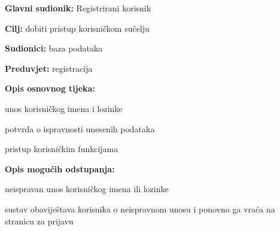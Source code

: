 \noindent {}
\begin{packed_item}
	\item \textbf{Glavni sudionik: }Registrirani korisnik
	\item  \textbf{Cilj:} dobiti pristup korisničkom sučelju
	\item  \textbf{Sudionici:} baza podataka
	\item  \textbf{Preduvjet:} registracija
	\item  \textbf{Opis osnovnog tijeka:}
	
	\item[] \begin{packed_enum}
		
		\item unos korisničkog imena i lozinke
		\item potvrda o ispravnosti unesenih podataka
		\item pristup korisničkim funkcijama
	\end{packed_enum}
	
	\item  \textbf{Opis mogućih odstupanja:}
	
	\item[] \begin{packed_item}
		
		\item[1.a] neispravan unos korisničkog imena ili lozinke
		\item[] \begin{packed_enum}
			
			\item sustav obaviještava korisnika o neispravnom unosu i ponovno ga vraća na stranicu za prijavu
			
		\end{packed_enum}
	\end{packed_item}
\end{packed_item}

